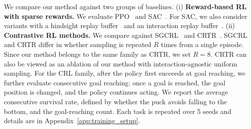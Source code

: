 We compare our method against two groups of baselines.
(i) \textbf{Reward-based RL with sparse rewards.}
We evaluate PPO~\citep{schulman2017proximal} and SAC~\citep{haarnoja2018sac}. For SAC, we also consider variants with a hindsight replay buffer~\citep{andrychowicz2017hindsight} and an interaction replay buffer~\citep{chuck2025null}.
(ii) \textbf{Contrastive RL methods.}
We compare against SGCRL~\citep{liu2025singlegoal} and CRTR~\citep{ziarko2026contrastive}. SGCRL and CRTR differ in whether sampling is repeated $R$ times from a single episode. Since our method belongs to the same family as CRTR, we set $R=8$. CRTR can also be viewed as an ablation of our method with interaction-agnostic uniform sampling.
For the CRL family, after the policy first succeeds at goal reaching, we further evaluate consecutive goal reaching: once a goal is reached, the goal position is changed, and the policy continues acting. We report the average consecutive survival rate, defined by whether the puck avoids falling to the bottom, and the goal-reaching count. Each task is repeated over 5 seeds and details are in Appendix~\ref{app:training_setup}.

